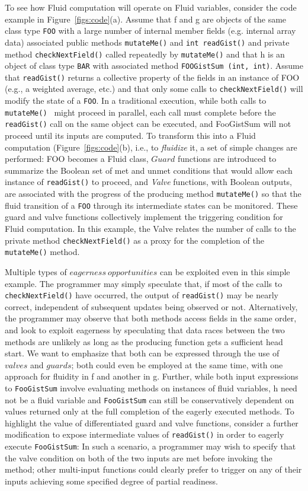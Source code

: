 To see how Fluid computation will operate on Fluid variables, consider the code example in Figure~\ref{figs:code}(a). Assume that f and g are objects of the same class type {\tt FOO} with a large number of internal member fields (e.g. internal array data) associated public methods {\tt mutateMe()} and {\tt int readGist()} and private method {\tt checkNextField()} called repeatedly by {\tt mutateMe()} and that h is an object of class type {\tt BAR} with associated method {\tt FOOGistSum (int, int)}. Assume that {\tt readGist()} returns a collective property of the fields in an instance of FOO (e.g., a weighted average, etc.) and that only some calls to {\tt checkNextField()} will modify the state of a {\tt FOO}. In a traditional execution, while both calls to {\tt mutateMe() } might proceed in parallel, each call must complete before the {\tt readGist()} call on the same object can be executed, and {FooGistSum} will not proceed until its inputs are computed. To transform this into a Fluid computation (Figure~\ref{figs:code}(b), i.e., to \textit{fluidize} it, a set of simple changes are performed: FOO becomes a Fluid class, $Guard$ functions are introduced to summarize the Boolean set of met and unmet conditions that would allow each instance of {\tt readGist()} to proceed, and \emph{Valve} functions, with Boolean outputs, are associated with the progress of the producing method {\tt mutateMe()} so that the fluid transition of a {\tt FOO} through its intermediate states can be monitored. These guard and valve functions collectively implement the triggering condition for Fluid computation. In this example, the Valve relates the number of calls to the private method {\tt checkNextField()} as a proxy for the completion of the {\tt mutateMe()} method. 

Multiple types of $eagerness\ opportunities$ can be exploited even in this simple example. The programmer may simply speculate that, if most of the calls to {\tt checkNextField()} have occurred, the output of {\tt readGist()} may be nearly correct, independent of subsequent updates being observed or not. Alternatively, the programmer may observe that both methods access fields in the same order, and look to exploit eagerness by speculating that data races between the two methods are unlikely as long as the producing function gets a sufficient head start. We want to emphasize that both can be expressed through the use of $valves$ and $guards$; both could even be employed at the same time, with one approach for fluidity in f and another in g. Further, while both input expressions to {\tt FooGistSum} involve evaluating methods on instances of fluid variables, h need not be a fluid variable and {\tt FooGistSum} can still be conservatively dependent on values returned only at the full completion of the eagerly executed methods. To highlight the value of differentiated guard and valve functions, consider a further modification to expose intermediate values of {\tt readGist()} in order to eagerly execute {\tt FooGistSum}: In such a scenario, a programmer may wish to specify that the valve condition on both of the two inputs are met before invoking the method; other multi-input functions could clearly prefer to trigger on any of their inputs achieving some specified degree of partial readiness.


